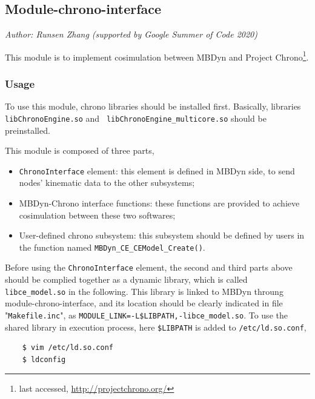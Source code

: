 \subsection{Module-chrono-interface}
\emph{Author: Runsen Zhang (supported by Google Summer of Code 2020)}

\noindent
This module is to implement cosimulation between MBDyn and Project Chrono\footnote{last accessed, \url{http://projectchrono.org/}}. 

\bigskip

\subsubsection{Usage}
\noindent
To use this module, chrono libraries should be installed first. Basically, libraries {\texttt{libChronoEngine.so}} and {\texttt{ libChronoEngine\_multicore.so}} should be preinstalled. 

\noindent
This module is composed of three parts, 
\begin{itemize}
\item {\texttt{ChronoInterface}} element: this element is defined in MBDyn side, to send nodes' kinematic data to the other subsystems;
\item MBDyn-Chrono interface functions: these functions are provided to achieve cosimulation between these two softwares;
\item User-defined chrono subsystem: this subsystem should be defined by users in the function named {\texttt{MBDyn\_CE\_CEModel\_Create()}}.
\end{itemize}

Before using the {\texttt{ChronoInterface}} element, the second and third parts above should be complied together as a dynamic library, which is called {\texttt{libce\_model.so}} in the following. This library is linked to MBDyn throung module-chrono-interface, and its location should be clearly indicated in file "{\texttt{Makefile.inc}}",
as {\texttt{MODULE\_LINK=-L\$LIBPATH,-libce\_model.so}}.
To use the shared library in execution process, here {\texttt{\$LIBPATH}} is added to {\texttt{/etc/ld.so.conf}},
\begin{verbatim}
	$ vim /etc/ld.so.conf
	$ ldconfig
\end{verbatim}

